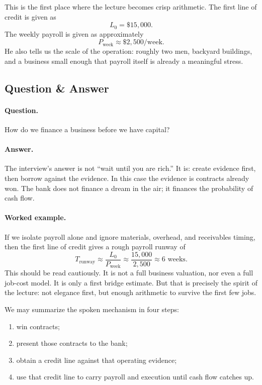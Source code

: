 This is the first place where the lecture becomes crisp arithmetic. The first line of credit is given as
\begin{equation}
L_0 = \$15{,}000.
\end{equation}
The weekly payroll is given as approximately
\begin{equation}
P_{\text{week}} \approx \$2{,}500/\text{week}.
\end{equation}
He also tells us the scale of the operation: roughly two men, backyard buildings, and a business small enough that payroll itself is already a meaningful stress.

\subsection{Question \& Answer}

\paragraph{Question.} How do we finance a business before we have capital?

\paragraph{Answer.} The interview's answer is not ``wait until you are rich.'' It is: create evidence first, then borrow against the evidence. In this case the evidence is contracts already won. The bank does not finance a dream in the air; it finances the probability of cash flow.

\paragraph{Worked example.} If we isolate payroll alone and ignore materials, overhead, and receivables timing, then the first line of credit gives a rough payroll runway of
\begin{equation}
T_{\text{runway}} \approx \frac{L_0}{P_{\text{week}}}
\approx \frac{15{,}000}{2{,}500} \approx 6 \text{ weeks}.
\end{equation}
This should be read cautiously. It is not a full business valuation, nor even a full job-cost model. It is only a first bridge estimate. But that is precisely the spirit of the lecture: not elegance first, but enough arithmetic to survive the first few jobs.

We may summarize the spoken mechanism in four steps:
\begin{enumerate}
\item win contracts;
\item present those contracts to the bank;
\item obtain a credit line against that operating evidence;
\item use that credit line to carry payroll and execution until cash flow catches up.
\end{enumerate}

